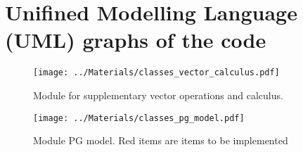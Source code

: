 \section{Unifined Modelling Language (UML) graphs of the code}

\begin{figure}[ht]
    \centering
    \texttt{[image: ../Materials/classes\_vector\_calculus.pdf]}
    \caption{Module for supplementary vector operations and calculus.}
\end{figure}


\begin{figure}[ht]
    \centering
    \texttt{[image: ../Materials/classes\_pg\_model.pdf]}
    \caption{Module PG model. Red items are items to be implemented}
\end{figure}
